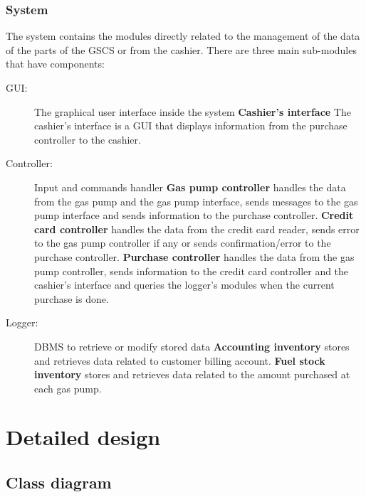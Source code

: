 \documentclass[a4paper, 11pt]{article}
\begin{document}
    \subsubsection{System}

    The system contains the modules directly related to the management of the
    data of the parts of the GSCS or from the cashier. There are three main
    sub-modules that have components:

    \begin{description}
        \item[GUI:] The graphical user interface inside the system
            \subitem\textbf{Cashier's interface} The cashier's interface is a
            GUI that displays information from the purchase controller to the
            cashier.
        \item[Controller:] Input and commands handler
            \subitem\textbf{Gas pump controller} handles the data from the gas
            pump and the gas pump interface, sends messages to the gas pump
            interface and sends information to the purchase controller.
            \subitem\textbf{Credit card controller} handles the data from the
            credit card reader, sends error to the gas pump controller if any
            or sends confirmation/error to the purchase controller.
            \subitem\textbf{Purchase controller} handles the data from the gas
            pump controller, sends information to the credit card controller
            and the cashier's interface and queries the logger's modules when
            the current purchase is done.
        \item[Logger:] DBMS to retrieve or modify stored data
            \subitem\textbf{Accounting inventory} stores and retrieves data
            related to customer billing account.
            \subitem\textbf{Fuel stock inventory} stores and retrieves data
            related to the amount purchased at each gas pump.
    \end{description}

    \section{Detailed design}

    \subsection{Class diagram}
\end{document}
